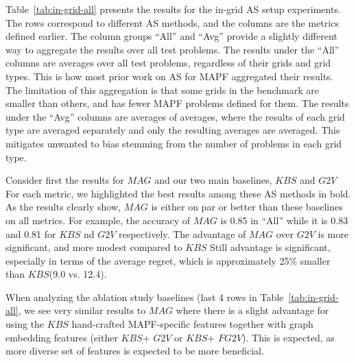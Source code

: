 \documentclass{ecai}
\newcommand{\Carmel}[1]{}
\newcommand{\Roni}[1]{}
\newcommand{\gtv}[1]{\ensuremath{\textit{G2V}}\xspace}
\newcommand{\fgtv}[1]{\ensuremath{\textit{FG2V}}\xspace}
\newcommand{\kaduri}[1]{\ensuremath{\textit{KBS}}\xspace}
\newcommand{\mapfgas}[1]{\ensuremath{\textit{MAG}}\xspace}
\begin{document}
Table~\ref{tab:in-grid-all} presents the results for the in-grid AS setup experiments. 
The rows correspond to different AS methods, and the columns are the metrics defined earlier. 
The column groups ``All'' and ``Avg'' provide a slightly different way to aggregate the results over all test problems. 
The results under the ``All'' columns are averages over all test problems, regardless of their grids and grid types. 
This is how most prior work on AS for MAPF aggregated their results. 
The limitation of this aggregation is that some grids in the benchmark are smaller than others, and has fewer MAPF problems defined for them. 
The results under the ``Avg'' columns are averages of averages, where the results of each grid type are averaged separately and only the resulting averages are averaged. This mitigates unwanted to bias stemming from the number of problems in each grid type. 


Consider first the results for \mapfgas\ and our two main baselines, \kaduri\ and \gtv .
For each metric, we highlighted the best results among these AS methods in bold. 
As the results clearly show, \mapfgas\ is either on par or better than these baselines on all metrics. 
For example, the accuracy of \mapfgas\ is 0.85 in ``All'' while it is 0.83 and 0.81 for \kaduri and \gtv, respectively. 
The advantage of \mapfgas\ over \gtv\ is more significant, and more modest compared to \kaduri. 
Still advantage is significant, especially in terms of the average regret, which is approximately 25\% smaller than \kaduri\ (9.0 vs. 12.4). 


When analyzing the ablation study baselines (last 4 rows in Table~\ref{tab:in-grid-all}, we see very similar results to \mapfgas, where there is a slight advantage for using the \kaduri\ hand-crafted MAPF-specific features together with graph embedding features (either \kaduri\ + \gtv\ or \kaduri\ + \fgtv\ ). 
This is expected, as more diverse set of features is expected to be more beneficial. 
\end{document}
